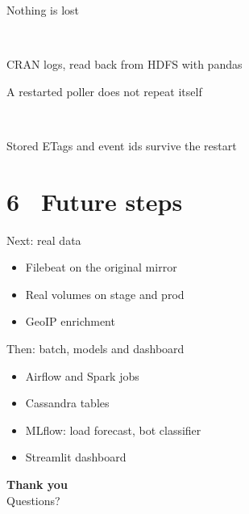 \documentclass[aspectratio=169,11pt]{beamer}
\newcommand{\bignum}[3]{\begin{minipage}[t]{#1}\centering{\fontsize{34}{36}\selectfont\bfseries\color{#2}#3}\end{minipage}}
\begin{document}
\begin{frame}{Nothing is lost}
  \centering\vspace{0.3cm}
  \bignum{3.2cm}{navy}{2462}\bignum{1.2cm}{greyc}{=}\bignum{3.2cm}{okc}{2456}\bignum{1.2cm}{greyc}{+}\bignum{2.0cm}{badc}{6}\\[0.2ex]
  {\large\hspace{0.1cm}\makebox[1.2cm]{}\makebox[1.2cm]{}}

  \vspace{1.0cm}
  {\large CRAN logs, read back from HDFS with pandas}
\end{frame}

\begin{frame}{A restarted poller does not repeat itself}
  \centering\vspace{0.3cm}
  \bignum{3.6cm}{streamc}{214}\bignum{3.6cm}{batchc}{9}\bignum{3.6cm}{okc}{0}\\[0.2ex]
  {\large{}}

  \vspace{1.0cm}
  {\large Stored ETags and event ids survive the restart}
\end{frame}

\section{6 \ Future steps}
\begin{frame}{Next: real data}
  \begin{itemize}
    \item Filebeat on the original mirror
    \item Real volumes on stage and prod
    \item GeoIP enrichment
  \end{itemize}
\end{frame}

\begin{frame}{Then: batch, models and dashboard}
  \begin{itemize}
    \item Airflow and Spark jobs
    \item Cassandra tables
    \item MLflow: load forecast, bot classifier
    \item Streamlit dashboard
  \end{itemize}
\end{frame}

\begin{frame}[plain]
  \centering
  \vspace{2.6cm}
  {\Huge\bfseries\color{navy} Thank you}\\[1.2ex]
  {\Large\color{greyc} Questions?}
\end{frame}
\end{document}
